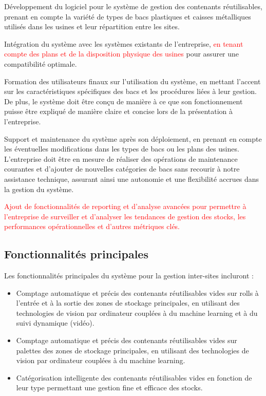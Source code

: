 \begin{itemize}
    \item[$\bullet$] Développement du logiciel pour le système de gestion des contenants réutilisables, prenant en compte la variété de types de bacs plastiques et caisses métalliques utilisés dans les usines et leur répartition entre les sites.
    \item[$\bullet$] Intégration du système avec les systèmes existants de l'entreprise,\textcolor{red}{ en tenant compte des plans et de la disposition physique des usines} pour assurer une compatibilité optimale.
	\item[$\bullet$] Formation des utilisateurs finaux sur l'utilisation du système, en mettant l'accent sur les caractéristiques spécifiques des bacs et les procédures liées à leur gestion. De plus, le système doit être conçu de manière à ce que son fonctionnement puisse être expliqué de manière claire et concise lors de la présentation à l'entreprise.
	\item[$\bullet$] Support et maintenance du système après son déploiement, en prenant en compte les éventuelles modifications dans les types de bacs ou les plans des usines. L'entreprise doit être en mesure de réaliser des opérations de maintenance courantes et d'ajouter de nouvelles catégories de bacs sans recourir à notre assistance technique, assurant ainsi une autonomie et une flexibilité accrues dans la gestion du système.
\textcolor{red}{\item[$\bullet$] Ajout de fonctionnalités de reporting et d'analyse avancées pour permettre à l'entreprise de surveiller et d'analyser les tendances de gestion des stocks, les performances opérationnelles et d'autres métriques clés.}

\end{itemize}

\subsection{Fonctionnalités principales}

Les fonctionnalités principales du système pour la gestion inter-sites incluront :\\

\begin{itemize}
    \item[$\bullet$] Comptage automatique et précis des contenants réutilisables vides sur rolls à l'entrée et à la sortie des zones de stockage principales, en utilisant des technologies de vision par ordinateur couplées à du machine learning et à du suivi dynamique (vidéo).
    \item[$\bullet$] Comptage automatique et précis des contenants réutilisables vides sur palettes des zones de stockage principales, en utilisant des technologies de vision par ordinateur couplées à du machine learning.
    \item[$\bullet$] Catégorisation intelligente des contenants réutilisables vides en fonction de leur type permettant une gestion fine et efficace des stocks.\\
\end{itemize}

